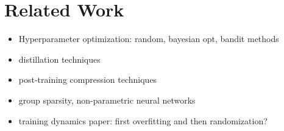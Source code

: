 \section{Related Work}

\begin{itemize}
    \item Hyperparameter optimization: random, bayesian opt, bandit methods
    \item distillation techniques
    \item post-training compression techniques
    \item group sparsity, non-parametric neural networks
    \item training dynamics paper: first overfitting and then randomization?
  \end{itemize}